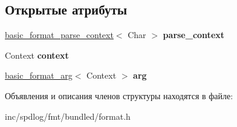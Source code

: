 \subsection*{Открытые атрибуты}
\begin{DoxyCompactItemize}
\item 
\mbox{\label{structformat__handler_a3091a12993aae06809ddc9c520fc2c95}} 
\hyperlink{classbasic__format__parse__context}{basic\+\_\+format\+\_\+parse\+\_\+context}$<$ Char $>$ {\bfseries parse\+\_\+context}
\item 
\mbox{\label{structformat__handler_ac4b040908991e61745acef69487df339}} 
Context {\bfseries context}
\item 
\mbox{\label{structformat__handler_a36cf5020da11b151d4ba46b0354a6356}} 
\hyperlink{classbasic__format__arg}{basic\+\_\+format\+\_\+arg}$<$ Context $>$ {\bfseries arg}
\end{DoxyCompactItemize}


Объявления и описания членов структуры находятся в файле\+:\begin{DoxyCompactItemize}
\item 
inc/spdlog/fmt/bundled/format.\+h\end{DoxyCompactItemize}
